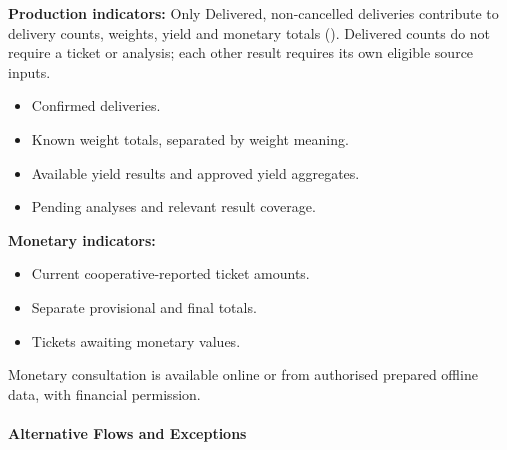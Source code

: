 \textbf{Production indicators:}
Only Delivered, non-cancelled deliveries contribute to delivery counts, weights,
yield and monetary totals (). Delivered counts do not require a
ticket or analysis; each other result requires its own eligible source inputs.
\begin{itemize}
    \item Confirmed deliveries.
    \item Known weight totals,
    separated by weight meaning.
    \item Available yield results
    and approved yield aggregates.
    \item Pending analyses and relevant
    result coverage.
\end{itemize}

\textbf{Monetary indicators:}
\begin{itemize}
    \item Current cooperative-reported
    ticket amounts.
    \item Separate provisional and final totals.
    \item Tickets awaiting monetary values.
\end{itemize}

Monetary consultation is available online or from authorised prepared offline data, with financial permission.

\paragraph{Alternative Flows and Exceptions}

